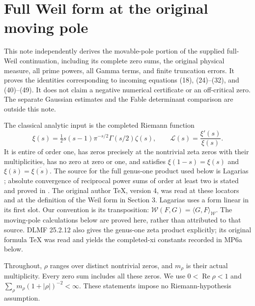 

\clearpage\begingroup
\part*{Full Weil form at the original moving pole}
\newtheorem{swpoletheorem}{Theorem}
\newtheorem{swpolelemma}[swpoletheorem]{Lemma}
\newcommand{\swpoleW}{\mathcal W}
\newcommand{\swpoleLL}{\mathscr L}
\newcommand{\swpoledd}{\,\mathrm d}
\newcommand{\swpoleRea}{\operatorname{Re}}
\newcommand{\swpoleIma}{\operatorname{Im}}
\newcommand{\swpolevM}{\Lambda_{\mathrm{vM}}}



This note independently derives the movable-pole portion of the supplied
full-Weil continuation, including its complete zero sums, the original
physical measure, all prime powers, all Gamma terms, and finite truncation
errors. It proves the identities corresponding to incoming equations
(18), (24)--(32), and (40)--(49). It does not claim a negative numerical
certificate or an off-critical zero. The separate Gaussian estimates and
the Fable determinant comparison are outside this note.

The classical analytic input is the completed Riemann function
\begin{equation}
 \xi(s)=\tfrac12s(s-1)\pi^{-s/2}\Gamma(s/2)\zeta(s),\qquad
 \swpoleLL(s)=\frac{\xi'(s)}{\xi(s)}.\tag{MP1}
\end{equation}
It is entire of order one, has zeros precisely at the nontrivial zeta zeros
with their multiplicities, has no zero at zero or one, and satisfies
$\xi(1-s)=\xi(s)$ and $\xi(\bar s)=\overline{\xi(s)}$.
The source for the full genus-one product used below is Lagarias
\cite[Lemma 4.1 and its proof]{swpole:Lagarias}; absolute convergence of reciprocal
power sums of order at least two is stated and proved in
\cite[Lemma 2.1]{swpole:Lagarias}. The original author TeX, version 4, was read at
these locators and at the definition of the Weil form in Section 3.
Lagarias uses a form linear in its first slot. Our convention is its
transposition: $\swpoleW(F,G)=\langle G,F\rangle_{\mathcal W}$.
The moving-pole calculations below are proved here, rather than attributed
to that source. DLMF 25.2.12 \cite{swpole:DLMFProduct} also gives the
genus-one zeta product explicitly; its original formula TeX was read
and yields the completed-xi constants recorded in MP6a below.

Throughout, $\rho$ ranges over distinct nontrivial zeros, and $m_\rho$ is
their actual multiplicity. Every zero sum includes all these zeros.
We use $0<\swpoleRea\rho<1$ and
$\sum_\rho m_\rho(1+|\rho|)^{-2}<\infty$. These statements impose no
Riemann-hypothesis assumption.

